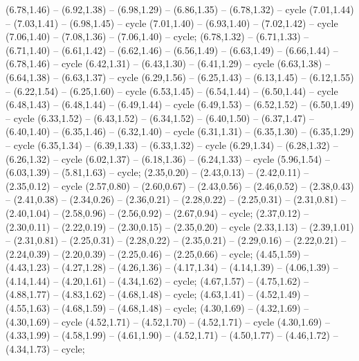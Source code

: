 { (6.78,1.46) -- (6.92,1.38) -- (6.98,1.29) -- (6.86,1.35) -- (6.78,1.32) -- cycle (7.01,1.44) -- (7.03,1.41) -- (6.98,1.45) -- cycle (7.01,1.40) -- (6.93,1.40) -- (7.02,1.42) -- cycle (7.06,1.40) -- (7.08,1.36) -- (7.06,1.40) -- cycle;
 (6.78,1.32) -- (6.71,1.33) -- (6.71,1.40) -- (6.61,1.42) -- (6.62,1.46) -- (6.56,1.49) -- (6.63,1.49) -- (6.66,1.44) -- (6.78,1.46) -- cycle (6.42,1.31) -- (6.43,1.30) -- (6.41,1.29) -- cycle (6.63,1.38) -- (6.64,1.38) -- (6.63,1.37) -- cycle (6.29,1.56) -- (6.25,1.43) -- (6.13,1.45) -- (6.12,1.55) -- (6.22,1.54) -- (6.25,1.60) -- cycle (6.53,1.45) -- (6.54,1.44) -- (6.50,1.44) -- cycle (6.48,1.43) -- (6.48,1.44) -- (6.49,1.44) -- cycle (6.49,1.53) -- (6.52,1.52) -- (6.50,1.49) -- cycle (6.33,1.52) -- (6.43,1.52) -- (6.34,1.52) -- (6.40,1.50) -- (6.37,1.47) -- (6.40,1.40) -- (6.35,1.46) -- (6.32,1.40) -- cycle (6.31,1.31) -- (6.35,1.30) -- (6.35,1.29) -- cycle (6.35,1.34) -- (6.39,1.33) -- (6.33,1.32) -- cycle (6.29,1.34) -- (6.28,1.32) -- (6.26,1.32) -- cycle (6.02,1.37) -- (6.18,1.36) -- (6.24,1.33) -- cycle (5.96,1.54) -- (6.03,1.39) -- (5.81,1.63) -- cycle;
 (2.35,0.20) -- (2.43,0.13) -- (2.42,0.11) -- (2.35,0.12) -- cycle (2.57,0.80) -- (2.60,0.67) -- (2.43,0.56) -- (2.46,0.52) -- (2.38,0.43) -- (2.41,0.38) -- (2.34,0.26) -- (2.36,0.21) -- (2.28,0.22) -- (2.25,0.31) -- (2.31,0.81) -- (2.40,1.04) -- (2.58,0.96) -- (2.56,0.92) -- (2.67,0.94) -- cycle;
 (2.37,0.12) -- (2.30,0.11) -- (2.22,0.19) -- (2.30,0.15) -- (2.35,0.20) -- cycle (2.33,1.13) -- (2.39,1.01) -- (2.31,0.81) -- (2.25,0.31) -- (2.28,0.22) -- (2.35,0.21) -- (2.29,0.16) -- (2.22,0.21) -- (2.24,0.39) -- (2.20,0.39) -- (2.25,0.46) -- (2.25,0.66) -- cycle;
 (4.45,1.59) -- (4.43,1.23) -- (4.27,1.28) -- (4.26,1.36) -- (4.17,1.34) -- (4.14,1.39) -- (4.06,1.39) -- (4.14,1.44) -- (4.20,1.61) -- (4.34,1.62) -- cycle;
 (4.67,1.57) -- (4.75,1.62) -- (4.88,1.77) -- (4.83,1.62) -- (4.68,1.48) -- cycle;
 (4.63,1.41) -- (4.52,1.49) -- (4.55,1.63) -- (4.68,1.59) -- (4.68,1.48) -- cycle;
 (4.30,1.69) -- (4.32,1.69) -- (4.30,1.69) -- cycle (4.52,1.71) -- (4.52,1.70) -- (4.52,1.71) -- cycle (4.30,1.69) -- (4.33,1.99) -- (4.58,1.99) -- (4.61,1.90) -- (4.52,1.71) -- (4.50,1.77) -- (4.46,1.72) -- (4.34,1.73) -- cycle;
}
